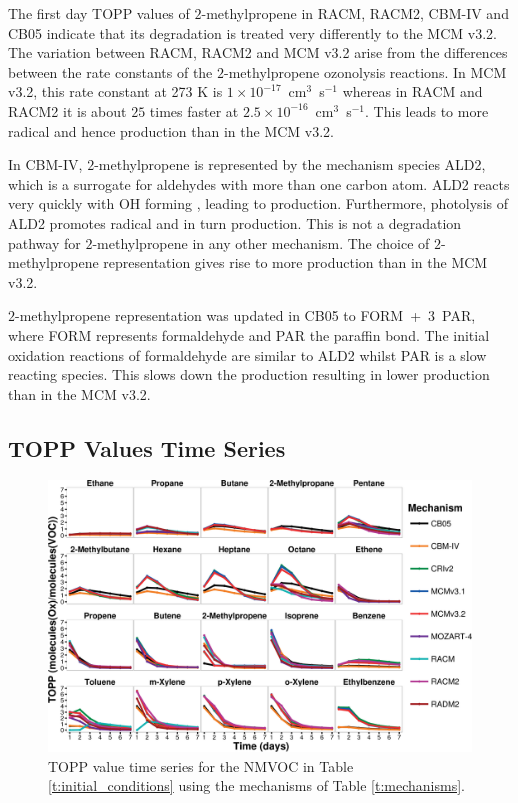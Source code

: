The first day TOPP values of $2$-methylpropene in RACM, RACM2, CBM-IV and CB05 indicate that its degradation is treated very differently to the MCM v3.2. 
The variation between RACM, RACM2 and MCM v3.2 arise from the differences between the rate constants of the $2$-methylpropene ozonolysis reactions. 
In MCM v3.2, this rate constant at 273 K is \mbox{$1 \times 10^{-17}$ cm$^3$ s$^{-1}$} whereas in RACM and RACM2 it is about $25$ times faster at \mbox{$2.5 \times 10^{-16}$ cm$^3$ s$^{-1}$}. 
This leads to more radical and hence  production than in the MCM v3.2.

In CBM-IV, $2$-methylpropene is represented by the mechanism species ALD2, which is a surrogate for aldehydes with more than one carbon atom. 
ALD2 reacts very quickly with OH forming , leading to  production. 
Furthermore, photolysis of ALD2 promotes radical and in turn  production. 
This is not a degradation pathway for $2$-methylpropene in any other mechanism. 
The choice of $2$-methylpropene representation gives rise to more  production than in the MCM v3.2.

$2$-methylpropene representation was updated in CB05 to \mbox{FORM + $3$ PAR}, where FORM represents formaldehyde and PAR the paraffin  bond. 
The initial oxidation reactions of formaldehyde are similar to ALD2 whilst PAR is a slow reacting species. 
This slows down the  production resulting in lower  production than in the MCM v3.2.

\subsection{TOPP Values Time Series} \label{ss:profiles} %

\begin{figure}
    \begin{center}
        \includegraphics[width=\textwidth]{img/TOPP_daily_values_all_species}
    \end{center}
    \caption{TOPP value time series for the NMVOC in Table \ref{t:initial_conditions} using the mechanisms of Table \ref{t:mechanisms}.}
    \label{f:TOPP_dailies}
\end{figure}

